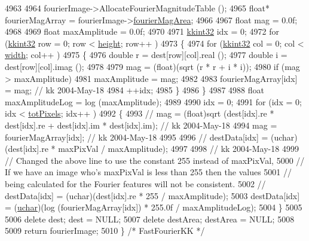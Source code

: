 \begin{DoxyCode}
4963 
4964   fourierImage->AllocateFourierMagnitudeTable ();
4965   \textcolor{keywordtype}{float}* fourierMagArray = fourierImage->\hyperlink{class_k_k_b_1_1_raster_adc50969a106f5b57aca3a9ce512df0ce}{fourierMagArea};
4966 
4967   \textcolor{keywordtype}{float}  mag = 0.0f;
4968 
4969   \textcolor{keywordtype}{float}  maxAmplitude = 0.0f;
4970 
4971   \hyperlink{namespace_k_k_b_a8fa4952cc84fda1de4bec1fbdd8d5b1b}{kkint32} idx = 0;
4972   \textcolor{keywordflow}{for}  (\hyperlink{namespace_k_k_b_a8fa4952cc84fda1de4bec1fbdd8d5b1b}{kkint32} row = 0; row < \hyperlink{class_k_k_b_1_1_raster_af39ff189de4fbb6de98392e187efafb7}{height}; row++ )
4973   \{
4974     \textcolor{keywordflow}{for} (\hyperlink{namespace_k_k_b_a8fa4952cc84fda1de4bec1fbdd8d5b1b}{kkint32} col = 0; col < \hyperlink{class_k_k_b_1_1_raster_ae0bcc103e191c3421d7692dc69ceb554}{width}; col++ )
4975     \{
4976       \textcolor{keywordtype}{double}  r = dest[row][col].real ();
4977       \textcolor{keywordtype}{double}  i = dest[row][col].imag ();
4978 
4979       mag = (float)(sqrt (r * r + i * i));
4980       \textcolor{keywordflow}{if}  (mag > maxAmplitude)
4981         maxAmplitude = mag;
4982 
4983       fourierMagArray[idx] = mag;  \textcolor{comment}{// kk 2004-May-18}
4984       ++idx;
4985     \}
4986   \}
4987 
4988   \textcolor{keywordtype}{float}  maxAmplitudeLog = log (maxAmplitude);
4989 
4990   idx = 0;
4991   \textcolor{keywordflow}{for} (idx = 0; idx < \hyperlink{class_k_k_b_1_1_raster_a9b08c4a0ca0a35435a478599635f1dc0}{totPixels}; idx++ )
4992   \{
4993     \textcolor{comment}{//  mag = (float)sqrt (dest[idx].re * dest[idx].re + dest[idx].im * dest[idx].im);  // kk 2004-May-18}
4994     mag = fourierMagArray[idx];                                                         \textcolor{comment}{// kk 2004-May-18}
4995 
4996     \textcolor{comment}{// destData[idx] = (uchar)(dest[idx].re * maxPixVal / maxAmplitude);}
4997 
4998     \textcolor{comment}{// kk  2004-May-18}
4999     \textcolor{comment}{// Changed the above line to use the constant 255 instead of maxPixVal,  }
5000     \textcolor{comment}{// If we have an image who's maxPixVal is less than 255 then the values}
5001     \textcolor{comment}{// being calculated for the Fourier features will not be consistent.}
5002     \textcolor{comment}{// destData[idx] = (uchar)(dest[idx].re * 255 / maxAmplitude);}
5003     destData[idx] = (\hyperlink{namespace_k_k_b_ace9969169bf514f9ee6185186949cdf7}{uchar})(log (fourierMagArray[idx]) * 255.0f / maxAmplitudeLog);
5004   \}
5005 
5006   \textcolor{keyword}{delete}  dest;      dest     = NULL;
5007   \textcolor{keyword}{delete}  destArea;  destArea = NULL;
5008 
5009   \textcolor{keywordflow}{return}  fourierImage;
5010 \}  \textcolor{comment}{/* FastFourierKK */}
\end{DoxyCode}
